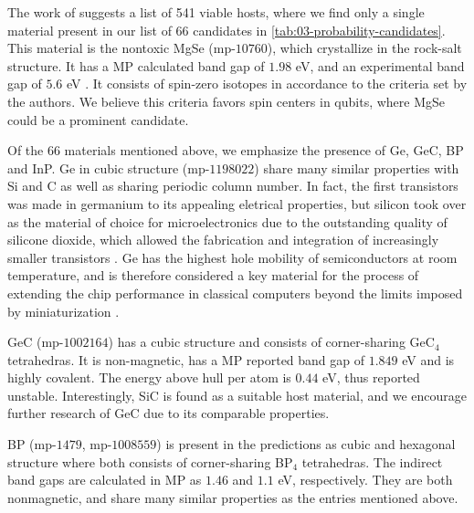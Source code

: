 

The work of \citeauthor{Ferrenti2020} \cite{Ferrenti2020} suggests a list of 541 viable hosts, where we find only a single material present in our list of $66$ candidates in \autoref{tab:03-probability-candidates}. This material is the nontoxic MgSe (mp-$10760$), which crystallize in the rock-salt structure.
It has a MP calculated band gap of $1.98$ eV, and an experimental band gap of $5.6$ eV \cite{SaumGeorge1959}. It consists of spin-zero isotopes in accordance to the criteria set by the authors. We believe this criteria favors spin centers in qubits, where MgSe could be a prominent candidate.

Of the $66$ materials mentioned above, we emphasize the presence of Ge, GeC, BP and InP. Ge in cubic structure (mp-$1198022$) share many similar properties with Si and C as well as sharing periodic column number. In fact, the first transistors was made in germanium to its appealing eletrical properties, but silicon took over as the material of choice for microelectronics due to the outstanding quality of silicone dioxide, which allowed the fabrication and integration of increasingly smaller transistors \cite{Scappucci2020, Pillarisetty2011}. Ge has the highest hole mobility of semiconductors at room temperature, and is therefore considered a key material for the process of extending the chip performance in classical computers beyond the limits imposed by miniaturization \cite{Scappucci2020}.

GeC (mp-$1002164$) has a cubic structure and consists of corner-sharing GeC$_4$ tetrahedras. It is non-magnetic, has a MP reported band gap of $1.849$ eV and is highly covalent. The energy above hull per atom is $0.44$ eV, thus reported unstable. Interestingly, SiC is found as a suitable host material, and we encourage further research of GeC due to its comparable properties.

BP (mp-$1479$, mp-$1008559$) is present in the predictions as cubic and hexagonal structure where both consists of corner-sharing BP$_4$ tetrahedras. The indirect band gaps are calculated in MP as $1.46$ and $1.1$ eV, respectively. They are both nonmagnetic, and share many similar properties as the entries mentioned above.


